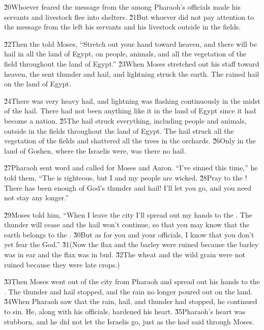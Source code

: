 \v{20}Whoever feared the message from the  among Pharaoh's officials made his servants and livestock flee into shelters. \v{21}But whoever did not pay attention to the message from the  left his servants and his livestock outside in the fields.

\v{22}Then the  told Moses, ``Stretch out your hand toward heaven, and there will be hail in all the land of Egypt, on people, animals, and all the vegetation of the field throughout the land of Egypt.'' \v{23}When Moses stretched out his staff toward heaven, the  sent thunder and hail, and lightning struck the earth. The  rained hail on the land of Egypt.

\v{24}There was very heavy hail, and lightning was flashing continuously in the midst of the hail. There had not been anything like it in the land of Egypt since it had become a nation. \v{25}The hail struck everything, including people and animals, outside in the fields throughout the land of Egypt. The hail struck all the vegetation of the fields and shattered all the trees in the orchards. \v{26}Only in the land of Goshen, where the Israelis were, was there no hail.

\v{27}Pharaoh sent word and called for Moses and Aaron. ``I've sinned this time,'' he told them. ``The  is righteous, but I and my people are wicked. \v{28}Pray to the ! There has been enough of God's thunder and hail! I'll let you go, and you need not stay any longer.''

\v{29}Moses told him, ``When I leave the city I'll spread out my hands to the . The thunder will cease and the hail won't continue, so that you may know that the earth belongs to the . \v{30}But as for you and your officials, I know that you don't yet fear the  God.'' \v{31}(Now the flax and the barley were ruined because the barley was in ear and the flax was in bud. \v{32}The wheat and the wild grain were not ruined because they were late crops.)

\v{33}Then Moses went out of the city from Pharaoh and spread out his hands to the . The thunder and hail stopped, and the rain no longer poured out on the land. \v{34}When Pharaoh saw that the rain, hail, and thunder had stopped, he continued to sin. He, along with his officials, hardened his heart. \v{35}Pharaoh's heart was stubborn, and he did not let the Israelis go, just as the  had said through Moses.


